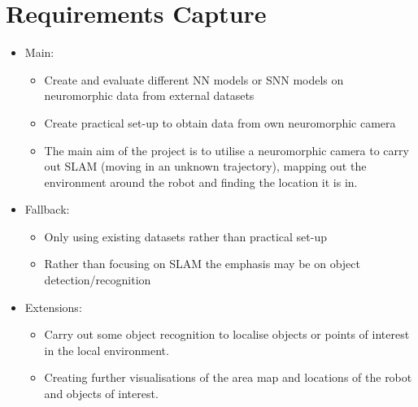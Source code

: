 \chapter{Requirements Capture}


\begin{itemize}
    \item Main:
          \begin{itemize}
              \item  Create and evaluate different NN models or SNN models on neuromorphic data from external datasets
              \item Create practical set-up to obtain data from own neuromorphic camera
              \item The main aim of the project is to utilise a neuromorphic camera to carry out SLAM (moving in an unknown trajectory), mapping out the environment around the robot and finding the location it is in.
          \end{itemize}
    \item Fallback:
          \begin{itemize}
              \item  Only using existing datasets rather than practical set-up
              \item Rather than focusing on SLAM the emphasis may be on object detection/recognition
          \end{itemize}
    \item Extensions:
          \begin{itemize}
              \item Carry out some object recognition to localise objects or points of interest in the local environment.
              \item Creating further visualisations of the area map and locations of the robot and objects of interest.
          \end{itemize}
\end{itemize}
